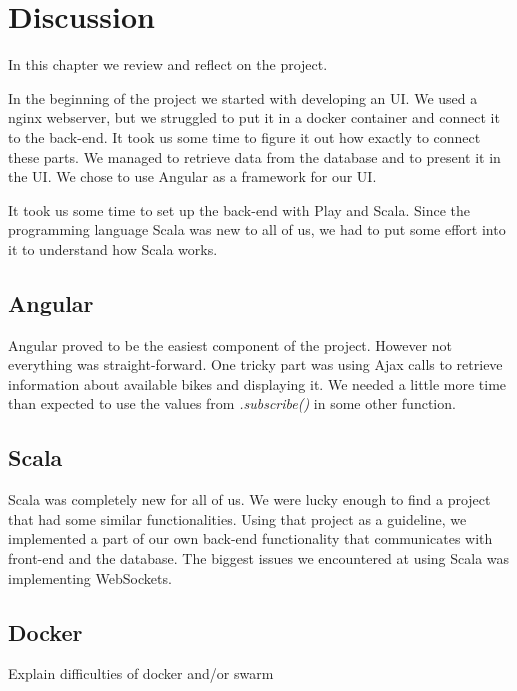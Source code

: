 \section{Discussion}

In this chapter we review and reflect on the project.

In the beginning of the project we started with developing an UI. We used a nginx webserver, but we struggled to put it in a docker container and connect it to the back-end. It took us some time to figure it out how exactly to connect these parts. We managed to retrieve data from the database and to present it in the UI. We chose to use Angular as a framework for our UI.

It took us some time to set up the back-end with Play and Scala. Since the programming language Scala was new to all of us, we had to put some effort into it to understand how Scala works.
\subsection{Angular}
Angular proved to be the easiest component of the project.  However not everything was straight-forward. One tricky part was using Ajax calls to retrieve information about available bikes and displaying it. We needed a little more time than expected to use the values from \textit{.subscribe()} in some other function.
\subsection{Scala}
Scala was completely new for all of us. We were lucky enough to find a project that had some similar functionalities. Using that project as a guideline, we implemented a part of our own back-end functionality that communicates with front-end and the database. The biggest issues we encountered at using Scala was implementing WebSockets.
\subsection{Docker}
Explain difficulties of docker and/or swarm

